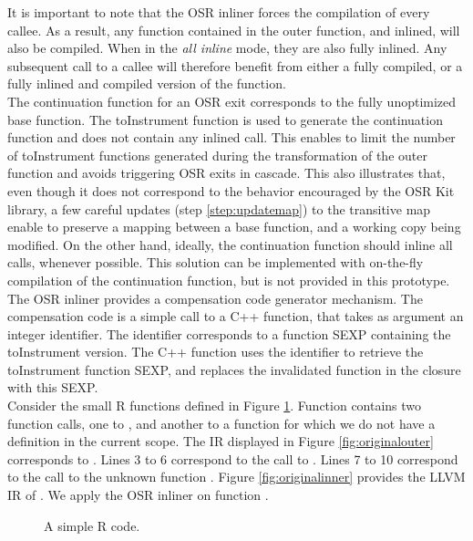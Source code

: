 It is important to note that the OSR inliner forces the compilation of every callee. 
As a result, any function contained in the outer function, and inlined, will also be compiled. 
When in the \textit{all inline} mode, they are also fully inlined.
Any subsequent call to a callee will therefore benefit from either a fully compiled, or a fully inlined and compiled version of the function.\\

The continuation function for an OSR exit corresponds to the fully unoptimized base function. 
The toInstrument function is used to generate the continuation function and does not contain any inlined call.
This enables to limit the number of toInstrument functions generated during the transformation of the outer function and avoids triggering OSR exits in cascade.
This also illustrates that, even though it does not correspond to the behavior encouraged by the OSR Kit library, a few careful updates (step \ref{step:updatemap}) to the transitive map enable to preserve a mapping between a base function, and a working copy being modified.
On the other hand, ideally, the continuation function should inline all calls, whenever possible.
This solution can be implemented with on-the-fly compilation of the continuation function, but is not provided in this prototype.\\

The OSR inliner provides a compensation code generator mechanism. 
The compensation code is a simple call to a C++ function, that takes as argument an integer identifier.
The identifier corresponds to a function SEXP containing the toInstrument version.
The C++ function uses the identifier to retrieve the toInstrument function SEXP, and replaces the invalidated function in the closure with this SEXP.\\

Consider the small R functions defined in Figure \ref{fig:simplercode}.
Function  contains two function calls, one to , and another to a function  for which we do not have a definition in the current scope.
The IR displayed in Figure \ref{fig:originalouter} corresponds to .
Lines 3 to 6 correspond to the call to .
Lines 7 to 10 correspond to the call to the unknown function .
Figure \ref{fig:originalinner} provides the LLVM IR of .
We apply the OSR inliner on function .\\

\begin{figure}[h!]
\centering
{}
\caption{A simple R code.}
\label{fig:simplercode}
\end{figure}

